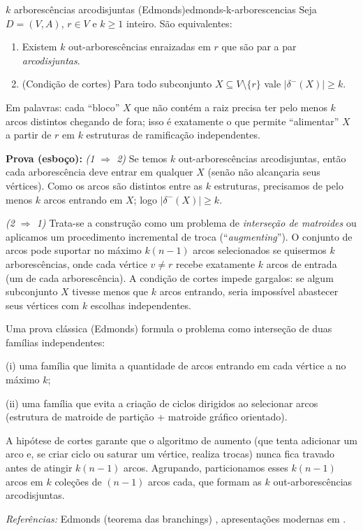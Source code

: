 \begin{teobox}{$k$ arborescências arcodisjuntas (Edmonds)}{edmonds-k-arborescencias}
	Seja $D=(V,A)$, $r\in V$ e $k\ge 1$ inteiro. São equivalentes:
	\begin{enumerate}\setlength{\itemsep}{4pt}
		\item Existem $k$ out-arborescências enraizadas em $r$ que são par a par \emph{arcodisjuntas}.
		\item (Condição de cortes) Para todo subconjunto $X\subseteq V\setminus\{r\}$ vale $|\delta^-(X)| \ge k$.
	\end{enumerate}
	Em palavras: cada “bloco” $X$ que não contém a raiz precisa ter pelo menos $k$ arcos distintos chegando de fora; isso é exatamente o que permite ``alimentar'' $X$ a partir de $r$ em $k$ estruturas de ramificação independentes.


	\textbf{Prova (esboço):}
	\emph{(1 $\Rightarrow$ 2)} Se temos $k$ out-arborescências arcodisjuntas, então cada arborescência deve entrar em qualquer $X$ (senão não alcançaria seus vértices). Como os arcos são distintos entre as $k$ estruturas, precisamos de pelo menos $k$ arcos entrando em $X$; logo $|\delta^-(X)|\ge k$.


	\emph{(2 $\Rightarrow$ 1)} Trata-se a construção como um problema de \emph{interseção de matroides} ou aplicamos um procedimento incremental de troca (``\textit{augmenting}''). O conjunto de arcos pode suportar no máximo $k(n-1)$ arcos selecionados se quisermos $k$ arborescências, onde cada vértice $v \neq r$ recebe exatamente $k$ arcos de entrada (um de cada arborescência). A condição de cortes impede gargalos: se algum subconjunto $X$ tivesse menos que $k$ arcos entrando, seria impossível abastecer seus vértices com $k$ escolhas independentes.


	Uma prova clássica (Edmonds) formula o problema como interseção de duas famílias independentes:


	(i) uma família que limita a quantidade de arcos entrando em cada vértice a no máximo $k$;


	(ii) uma família que evita a criação de ciclos dirigidos ao selecionar arcos (estrutura de matroide de partição + matroide gráfico orientado).


	A hipótese de cortes garante que o algoritmo de aumento (que tenta adicionar um arco e, se criar ciclo ou saturar um vértice, realiza trocas) nunca fica travado antes de atingir $k(n-1)$ arcos. Agrupando, particionamos esses $k(n-1)$ arcos em $k$ coleções de $(n-1)$ arcos cada, que formam as $k$ out-arborescências arcodisjuntas.

	\medskip
	\emph{Referências:} Edmonds (teorema das branchings) \cite{edmonds1967optimum}, apresentações modernas em \cite{schrijver2003comb}.
	\label{thm:edmonds-disjoint-arborescencias}
\end{teobox}



